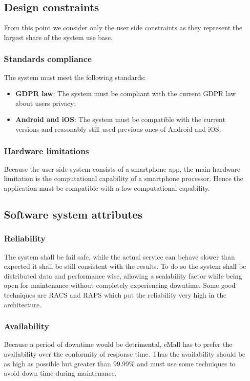 \subsection{Design constraints}
From this point we consider only the user side constraints as they represent the largest share of the system use base.
\subsubsection{Standards compliance}
The system must meet the following standards:
\begin{itemize}
    \item \textbf{\ac{GDPR} law}: The system must be compliant with the current GDPR law about users privacy;
    \item \textbf{Android and iOS}: The system must be compatible with the current versions and reasonably still used previous ones of Android and iOS.
\end{itemize}
\subsubsection{Hardware limitations}
Because the user side system consists of a smartphone app, the main hardware limitation is the computational capability of a smartphone processor. Hence the
application must be compatible with a low computational capability.

\subsection{Software system attributes}
\subsubsection{Reliability}
The system shall be fail safe, while the actual service can behave slower than expected it shall be still consistent with the results.
To do so the system shall be distributed data and performance wise, allowing a scalability factor while being open for maintenance without completely experiencing downtime.
Some good techniques are \ac{RACS} and \ac{RAPS} which put the reliability very high in the architecture.
\subsubsection{Availability}
Because a period of downtime would be detrimental, eMall has to prefer the availability over the conformity of response time.
Thus the availability should be as high as possible but greater than 99.99\% and must use some techniques to avoid down time during maintenance.

